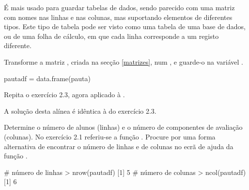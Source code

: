 \documentclass{exam}
\begin{document}
É mais usado para guardar tabelas de dados, sendo parecido com uma matriz com nomes nas linhas e nas colunas, mas suportando elementos de diferentes tipos. Este tipo de tabela pode ser visto como uma tabela de uma base de dados, ou de uma folha de cálculo, em que cada linha corresponde a um registo diferente.

\begin{questions}
\question Transforme a matriz , criada na secção \ref{matrizes}, num , e guarde-o na variável .

\begin{solution}
	\begin{rcode}
		pautadf = data.frame(pauta)
	\end{rcode}
\end{solution}

\question Repita o exercício 2.3, agora aplicado à .

\begin{solution}
	A solução desta alínea é idêntica à do exercício 2.3.
\end{solution}

\question Determine o número de alunos (linhas) e o número de componentes de avaliação (colunas). No exercício 2.1 referiu-se a função . Procure por uma forma alternativa de encontrar o número de linhas e de colunas no ecrã de ajuda da função .

\begin{solution}
	\begin{rcode}
		# número de linhas
		> nrow(pautadf)
		[1] 5
		# número de colunas
		> ncol(pautadf)
		[1] 6
	\end{rcode}
\end{solution}

%


\end{questions}
\end{document}
